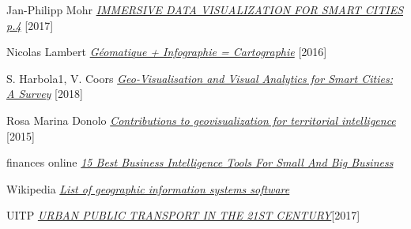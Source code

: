 \documentclass[french, a4paper, 12pt]{report}
\begin{document}
\begin{thebibliography}{9}
 Jan-Philipp Mohr \href{https://hashplay.net/wp-content/uploads/2017/11/HASHPLAY-Smart-City-whitepaper-v2.pdf}{\emph{IMMERSIVE DATA VISUALIZATION
FOR SMART CITIES p.4}} [2017]


 Nicolas Lambert \href{https://neocarto.hypotheses.org/2068}{\emph{Géomatique + Infographie = Cartographie}} [2016]

 S. Harbola1, V. Coors \href{https://www.researchgate.net/publication/327785603_GEO-VISUALISATION_AND_VISUAL_ANALYTICS_FOR_SMART_CITIES_A_SURVEY}{\emph{Geo-Visualisation and Visual Analytics for Smart Cities: A Survey}} [2018]

 Rosa Marina Donolo \href{http://theses.insa-lyon.fr/publication/2014ISAL0075/these.pdf}{\emph{Contributions to geovisualization for territorial intelligence}} [2015]

 finances online \href{https://financesonline.com/15-best-business-intelligence-tools-small-big-business/#looker}{\emph{15 Best Business Intelligence Tools For Small And Big Business}}

 Wikipedia \href{https://ipfs.io/ipfs/QmXoypizjW3WknFiJnKLwHCnL72vedxjQkDDP1mXWo6uco/wiki/List_of_geographic_information_systems_software.html}{\emph{List of geographic information systems software}}

 UITP \href{https://www.uitp.org/sites/default/files/cck-focus-papers-files/UITP_Statistic\%20Brief_national\%20PT\%20stats.pdf}{\emph{URBAN PUBLIC TRANSPORT IN THE 21ST CENTURY}}[2017]



\end{thebibliography}
\newpage\null\thispagestyle{empty}\newpage

\appendix
\end{document}
